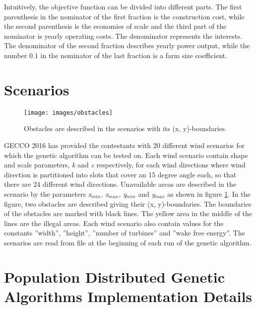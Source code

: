 \noindent Intuitively, the objective function can be divided into different parts. The first parenthesis in the nominator of the first fraction is the construction cost, while the second parenthesis is the economies of scale and the third part of the nominator is yearly operating costs. The denominator represents the interests. The denominator of the second fraction describes yearly power output, while the number $0.1$ in the nominator of the last fraction is a farm size coefficient. \\


\section{Scenarios}\label{section:scenarios}


\begin{figure}[h!]
\begin{center}
\texttt{[image: images/obstacles]}
\caption{Obstacles are described in the scenarios with its (x, y)-boundaries.}
\label{figure:obstacles}
\end{center}
\end{figure}


GECCO 2016 has provided the contestants with 20 different wind scenarios for which the genetic algorithm can be tested on. Each wind scenario contain shape and scale parameters, \textit{k} and \textit{c} respectively, for each wind directions where wind direction is partitioned into slots that cover an 15 degree angle each, so that there are 24 different wind directions. Unavailable areas are described in the scenario by the parameters \textit{x$_{min}$, x$_{max}$, y$_{min}$} and \textit{y$_{max}$} as shown in figure \ref{figure:obstacles}. In the figure, two obstacles are described giving their (x, y)-boundaries. The boundaries of the obstacles are marked with black lines. The yellow area in the middle of the lines are the illegal areas. Each wind scenario also contain values for the constants ''width'', ''height'', ''number of turbines'' and ''wake free energy''. The scenarios are read from file at the beginning of each run of the genetic algorithm. 

\section[PDGA's Implementation Details]{Population Distributed Genetic Algorithms Implementation Details}
\label{section:population distributed gas implementation details}


